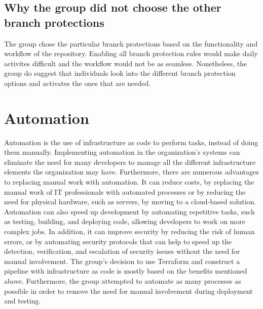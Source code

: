 \subsection{Why the group did not choose the other branch protections}%
The group chose the particular branch protections based on the functionality and workflow of the repository. Enabling all branch protection rules would make daily activites difficult and the workflow would not be as seamless. Nonetheless, the group do suggest that individuals look into the different branch protection options and activates the ones that are needed. 









\section{Automation}
Automation is the use of \gls{infrastructure as code} to perform tasks, instead of doing them manually. Implementing automation in the organization's systems can eliminate the need for many developers to manage all the different infrastructure elements the organization may have. Furthermore, there are numerous advantages to replacing manual work with automation. It can reduce costs, by replacing the manual work of IT professionals with automated processes or by reducing the need for physical hardware, such as servers, by moving to a cloud-based solution. Automation can also speed up development by automating repetitive tasks, such as testing, building, and deploying code, allowing developers to work on more complex jobs. In addition, it can improve security by reducing the risk of human errors, or by automating security protocols that can help to speed up the detection, verification, and escalation of security issues without the need for manual involvement. The group's decision to use Terraform and construct a pipeline with \gls{infrastructure as code} is mostly based on the benefits mentioned above. Furthermore, the group attempted to automate as many processes as possible in order to remove the need for manual involvement during deployment and testing. \cite{automation} \cite{automationredhat}

